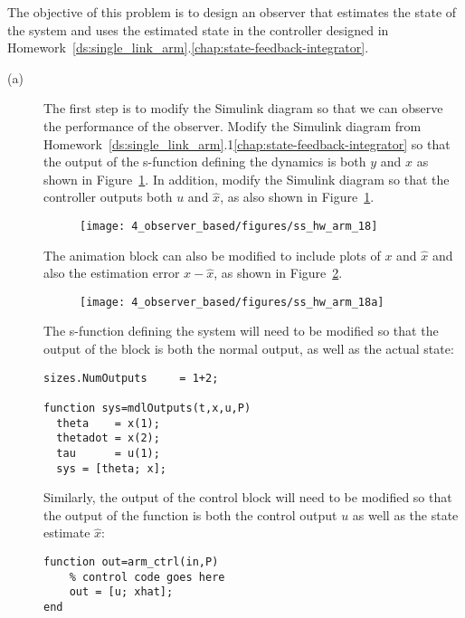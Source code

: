 
The objective of this problem is to design an observer that estimates the state of the system and uses the estimated state in the controller designed in Homework~\ref{ds:single_link_arm}.\ref{chap:state-feedback-integrator}.

\begin{description}\item[]
\item[(a)] The first step is to modify the Simulink diagram so that we can observe the performance of the observer.  Modify the Simulink diagram from Homework~\ref{ds:single_link_arm}.1\ref{chap:state-feedback-integrator} so that the output of the s-function defining the dynamics is both $y$ and $x$ as shown in Figure~\ref{fig:ss_hw_arm_18}.  In addition, modify the Simulink diagram so that the controller outputs both $u$ and $\hat{x}$, as also shown in Figure~\ref{fig:ss_hw_arm_18}.
\begin{figure}[hbt]
  \centering\texttt{[image: 4\_observer\_based/figures/ss\_hw\_arm\_18]}
  \caption{}
  \label{fig:ss_hw_arm_18}  
\end{figure}
The animation block can also be modified to include plots of $x$ and $\hat{x}$ and also the estimation error $x-\hat{x}$, as shown in Figure~\ref{fig:ss_hw_arm_18a}.
\begin{figure}[hbt]
  \centering\texttt{[image: 4\_observer\_based/figures/ss\_hw\_arm\_18a]}
  \caption{}
  \label{fig:ss_hw_arm_18a}  
\end{figure}
The s-function defining the system will need to be modified so that the output of the block is both the normal output, as well as the actual state:
\begin{lstlisting}
sizes.NumOutputs     = 1+2; 

function sys=mdlOutputs(t,x,u,P)
  theta    = x(1);
  thetadot = x(2);
  tau      = u(1);
  sys = [theta; x];
\end{lstlisting}

Similarly, the output of the control block will need to be modified so that the output of the function is both the control output $u$ as well as the state estimate $\hat{x}$:
\begin{lstlisting}
function out=arm_ctrl(in,P)
	% control code goes here
    out = [u; xhat];   
end
\end{lstlisting}


\end{description}
